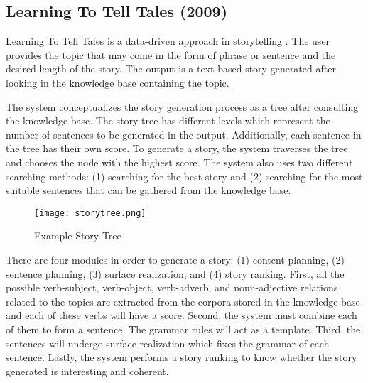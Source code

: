 \subsection{Learning To Tell Tales (2009)}
Learning To Tell Tales is a data-driven approach in storytelling \cite{McIntyreLapata2009}. The user provides the topic that may come in the form of phrase or sentence and the desired length of the story. The output is a text-based story generated after looking in the knowledge base containing the topic.

The system conceptualizes the story generation process as a tree after consulting the knowledge base. The story tree  has different levels which represent the number of sentences to be generated in the output. Additionally, each sentence in the tree has their own score. To generate a story, the system traverses the tree and chooses the node with the highest score. The system also uses two different searching methods: (1) searching for the best story and (2) searching for the most suitable sentences that can be gathered from the knowledge base.

\begin{figure}[!htb]                %
   \centering                    %
   \texttt{[image: storytree.png]}      %
   \caption{Example Story Tree} \cite{McIntyreLapata2009}
    \label{fig:storytree}
\end{figure}

There are four modules in order to generate a story: (1) content planning, (2) sentence planning, (3) surface realization, and (4) story ranking. First, all the possible verb-subject, verb-object, verb-adverb, and noun-adjective relations related to the topics are extracted from the corpora stored in the knowledge base and each of these verbs will have a score. Second, the system must combine each of them to form a sentence. The grammar rules will act as a template. Third, the sentences will undergo surface realization which fixes the grammar of each sentence. Lastly, the system performs a story ranking to know whether the story generated is interesting and coherent.

\clearpage

